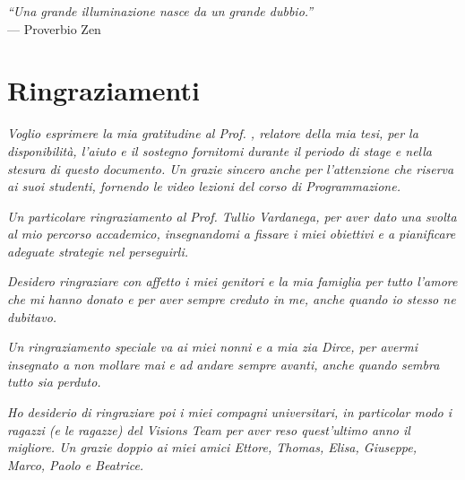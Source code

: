 
\cleardoublepage
{}
{}

\begin{flushright}{
	\slshape    
	``Una grande illuminazione nasce da un grande dubbio.''} \\ 
	\medskip
    --- Proverbio Zen
\end{flushright}


\bigskip

\begingroup
\let\clearpage\relax
\let\cleardoublepage\relax
\let\cleardoublepage\relax

\chapter*{Ringraziamenti}

\noindent \textit{Voglio esprimere la mia gratitudine al Prof. \myProf, relatore della mia tesi, per la disponibilità, l'aiuto e il sostegno fornitomi durante il periodo di stage e nella stesura di questo documento. Un grazie sincero anche per l'attenzione che riserva ai suoi studenti, fornendo le video lezioni del corso di Programmazione.}\\
\bigskip

\noindent \textit{Un particolare ringraziamento al Prof. Tullio Vardanega, per aver dato una svolta al mio percorso accademico, insegnandomi a fissare i miei obiettivi e a pianificare adeguate strategie nel perseguirli.}\\
\bigskip

\noindent \textit{Desidero ringraziare con affetto i miei genitori e la mia famiglia per tutto l'amore che mi hanno donato e per aver sempre creduto in me, anche quando io stesso ne dubitavo.}\\
\bigskip

\noindent \textit{Un ringraziamento speciale va ai miei nonni e a mia zia Dirce, per avermi insegnato a non mollare mai e ad andare sempre avanti, anche quando sembra tutto sia perduto.}\\
\bigskip

\noindent \textit{Ho desiderio di ringraziare poi i miei compagni universitari, in particolar modo i ragazzi (e le ragazze) del Visions Team per aver reso quest'ultimo anno il migliore. Un grazie doppio ai miei amici Ettore, Thomas, Elisa, Giuseppe, Marco, Paolo e Beatrice.}\\
\bigskip


